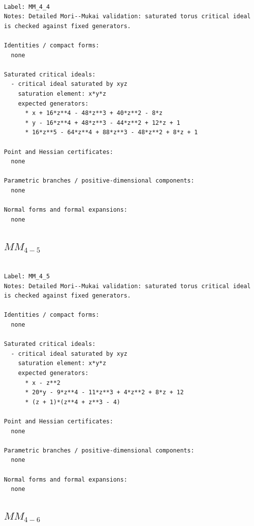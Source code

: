 \documentclass[10pt,a4paper]{article}
\begin{document}
\begin{lstlisting}

Label: MM_4_4
Notes: Detailed Mori--Mukai validation: saturated torus critical ideal is checked against fixed generators.

Identities / compact forms:
  none

Saturated critical ideals:
  - critical ideal saturated by xyz
    saturation element: x*y*z
    expected generators:
      * x + 16*z**4 - 48*z**3 + 40*z**2 - 8*z
      * y - 16*z**4 + 48*z**3 - 44*z**2 + 12*z + 1
      * 16*z**5 - 64*z**4 + 88*z**3 - 48*z**2 + 8*z + 1

Point and Hessian certificates:
  none

Parametric branches / positive-dimensional components:
  none

Normal forms and formal expansions:
  none

\end{lstlisting}

\subsection*{$ MM_{4-5} $}

\begin{lstlisting}

Label: MM_4_5
Notes: Detailed Mori--Mukai validation: saturated torus critical ideal is checked against fixed generators.

Identities / compact forms:
  none

Saturated critical ideals:
  - critical ideal saturated by xyz
    saturation element: x*y*z
    expected generators:
      * x - z**2
      * 20*y - 9*z**4 - 11*z**3 + 4*z**2 + 8*z + 12
      * (z + 1)*(z**4 + z**3 - 4)

Point and Hessian certificates:
  none

Parametric branches / positive-dimensional components:
  none

Normal forms and formal expansions:
  none

\end{lstlisting}

\subsection*{$ MM_{4-6} $}
\end{document}
